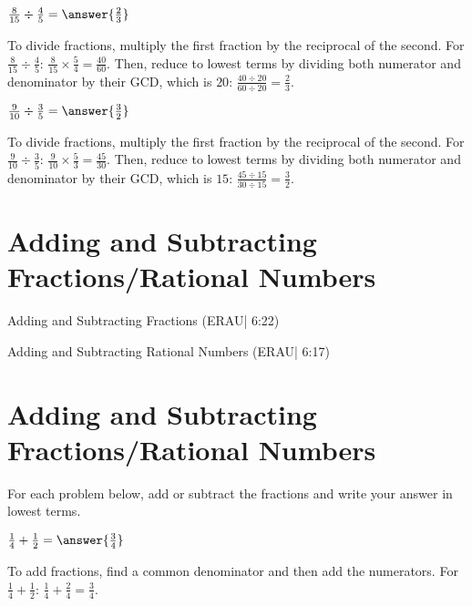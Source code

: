 \documentclass{ximera}
\begin{document}
\begin{problem}
$\frac{8}{15} \div \frac{4}{5} = \answer{\frac{2}{3}}$
\begin{feedback}
To divide fractions, multiply the first fraction by the reciprocal of the second. For $\frac{8}{15} \div \frac{4}{5}$: $\frac{8}{15} \times \frac{5}{4} = \frac{40}{60}$. Then, reduce to lowest terms by dividing both numerator and denominator by their GCD, which is $20$: $\frac{40 \div 20}{60 \div 20} = \frac{2}{3}$.
\end{feedback}
\end{problem}

\begin{problem}
$\frac{9}{10} \div \frac{3}{5} = \answer{\frac{3}{2}}$
\begin{feedback}
To divide fractions, multiply the first fraction by the reciprocal of the second. For $\frac{9}{10} \div \frac{3}{5}$: $\frac{9}{10} \times \frac{5}{3} = \frac{45}{30}$. Then, reduce to lowest terms by dividing both numerator and denominator by their GCD, which is $15$: $\frac{45 \div 15}{30 \div 15} = \frac{3}{2}$.
\end{feedback}
\end{problem}


\section*{Adding and Subtracting Fractions/Rational Numbers}

Adding and Subtracting Fractions (ERAU| 6:22)


Adding and Subtracting Rational Numbers (ERAU| 6:17)



\section*{Adding and Subtracting Fractions/Rational Numbers}

For each problem below, add or subtract the fractions and write your answer in lowest terms.

\begin{problem}
$\frac{1}{4} + \frac{1}{2} = \answer{\frac{3}{4}}$
\begin{feedback}
To add fractions, find a common denominator and then add the numerators. For $\frac{1}{4} + \frac{1}{2}$: $\frac{1}{4} + \frac{2}{4} = \frac{3}{4}$.
\end{feedback}
\end{problem}
\end{document}
